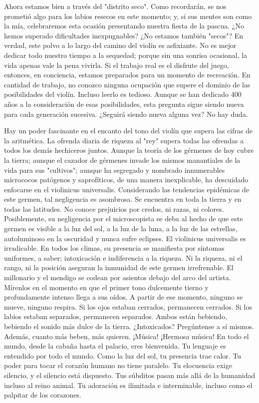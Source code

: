 \documentclass[12pt]{book}
\begin{document}
Ahora estamos bien a través del "distrito seco". Como recordarán, se nos prometió algo para los labios resecos en este momento; y, si sus mentes son como la mía, celebraremos esta ocasión presentando nuestra fiesta de la pascua. ¿No hemos superado dificultades inexpugnables? ¿No estamos también "secos"? En verdad, este polvo a lo largo del camino del violín es asfixiante. No es mejor dedicar todo nuestro tiempo a la sequedad; porque sin una sonrisa ocasional, la vida apenas vale la pena vivirla. Si el trabajo real es el disfrute del juego, entonces, en conciencia, estamos preparados para un momento de recreación. En cantidad de trabajo, no conozco ninguna ocupación que supere el dominio de las posibilidades del violín. Incluso leerlo es tedioso. Aunque se han dedicado 400 años a la consideración de esas posibilidades, esta pregunta sigue siendo nueva para cada generación sucesiva. ¿Seguirá siendo nueva alguna vez? No hay duda.

Hay un poder fascinante en el encanto del tono del violín que supera las cifras de la aritmética. La ofrenda diaria de riqueza al "rey" supera todas las ofrendas a todos los demás hechiceros juntos. Aunque la teoría de los gérmenes de hoy cubre la tierra; aunque el cazador de gérmenes invade los mismos manantiales de la vida para sus "cultivos"; aunque ha segregado y nombrado innumerables micrococos patógenos y saprofíticos, de una manera inexplicable, ha descuidado enfocarse en el violinicus universalis. Considerando las tendencias epidémicas de este germen, tal negligencia es asombrosa. Se encuentra en toda la tierra y en todas las latitudes. No conoce prejuicios por credos, ni razas, ni colores. Posiblemente, su negligencia por el microscopista se deba al hecho de que este germen es visible a la luz del sol, a la luz de la luna, a la luz de las estrellas, autoluminoso en la oscuridad y nunca sufre eclipses. El violinicus universalis es irradicable. En todos los climas, su presencia se manifiesta por síntomas uniformes, a saber; intoxicación e indiferencia a la riqueza. Ni la riqueza, ni el rango, ni la posición aseguran la inmunidad de este germen irrefrenable. El millonario y el mendigo se codean por asientos debajo del arco del artista. Mírenlos en el momento en que el primer tono dulcemente tierno y profundamente intenso llega a sus oídos. A partir de ese momento, ninguno se mueve, ninguno respira. Si los ojos estaban cerrados, permanecen cerrados. Si los labios estaban separados, permanecen separados. Ambos están bebiendo, bebiendo el sonido más dulce de la tierra. ¿Intoxicados? Pregúntense a sí mismos. Además, cuanto más beben, más quieren. ¡Música! ¡Hermosa música! En todo el mundo, desde la cabaña hasta el palacio, eres bienvenida. Tu lenguaje es entendido por todo el mundo. Como la luz del sol, tu presencia trae calor. Tu poder para tocar el corazón humano no tiene paralelo. Tu elocuencia exige silencio, y el silencio está dispuesto. Tus súbditos pasan más allá de la humanidad incluso al reino animal. Tu adoración es ilimitada e interminable, incluso como el palpitar de los corazones.
\end{document}
